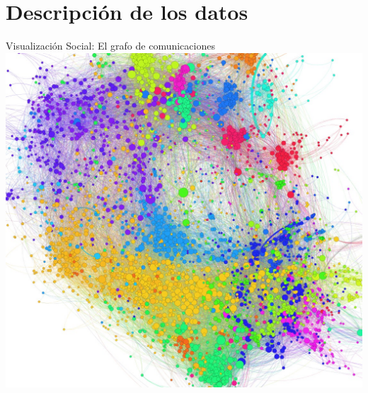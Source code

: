 \documentclass[xcolor=x11names]{beamer}
\begin{document}
\section{Descripción de los datos}

\begin{frame}{Visualización Social: El grafo de comunicaciones}
		\center\
		\includegraphics[scale=0.22]{slides/Graph-screenshot.jpg}
\end{frame}
\end{document}
